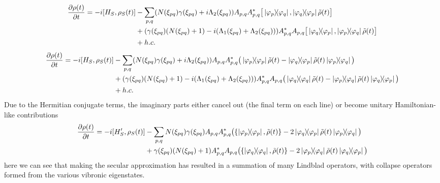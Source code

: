 \documentclass[]{article}
\begin{document}
\begin{itemize}
\begin{itemize}
\begin{align}
	\label{eq:VibronicSecular1}
	\begin{split}
		\pdv{\rho(t)}{t} = -i[H_S, \rho_S(t)] &- \sum_{p,q}  (N(\xi_{pq})\gamma(\xi_{pq})+i\Lambda_2(\xi_{pq})) A_{p,q}A_{p,q}^{*}\big[\dyad{\varphi_p}{\varphi_q}, \dyad{\varphi_q}{\varphi_p}\tilde{\rho}(t)\big] \\
		&+ (\gamma(\xi_{pq})(N(\xi_{pq})+1)-i(\Lambda_1(\xi_{pq})+\Lambda_2(\xi_{pq})))  A_{p,q}^{*}A_{p,q}\big[\dyad{\varphi_q}{\varphi_p}, \dyad{\varphi_p}{\varphi_q}\tilde{\rho}(t)\big]\\ &+ h.c. \\
	\end{split}
\end{align}
\begin{align}
	\label{eq:VibronicSecular2}
	\begin{split}
		\pdv{\rho(t)}{t} = -i[H_S, \rho_S(t)] &- \sum_{p,q}  (N(\xi_{pq})\gamma(\xi_{pq})+i\Lambda_2(\xi_{pq})) A_{p,q}A_{p,q}^{*}\big(\dyad{\varphi_p}{\varphi_p}\tilde{\rho}(t) - \dyad{\varphi_q}{\varphi_p}\tilde{\rho}(t)\dyad{\varphi_p}{\varphi_q}\big) \\
		&+ (\gamma(\xi_{pq})(N(\xi_{pq})+1)-i(\Lambda_1(\xi_{pq})+\Lambda_2(\xi_{pq})))  A_{p,q}^{*}A_{p,q}\big(\dyad{\varphi_q}{\varphi_q}\tilde{\rho}(t) - \dyad{\varphi_p}{\varphi_q}\tilde{\rho}(t)\dyad{\varphi_q}{\varphi_p}\big)\\ &+ h.c. \\
	\end{split}
\end{align}
Due to the Hermitian conjugate terms, the imaginary parts either cancel out (the final term on each line) or become unitary Hamiltonian-like contributions
\begin{align}
	\label{eq:VibronicSecular2}
	\begin{split}
		\pdv{\rho(t)}{t} = -i[H_S^{\prime}, \rho_S(t)] &- \sum_{p,q}  N(\xi_{pq})\gamma(\xi_{pq}) A_{p,q}A_{p,q}^{*}\big(\{\dyad{\varphi_p}{\varphi_p}, \tilde{\rho}(t)\} - 2\dyad{\varphi_q}{\varphi_p}\tilde{\rho}(t)\dyad{\varphi_p}{\varphi_q}\big) \\
		&+ \gamma(\xi_{pq})(N(\xi_{pq})+1)  A_{p,q}^{*}A_{p,q}\big(\{\dyad{\varphi_q}{\varphi_q}, \tilde{\rho}(t)\} - 2\dyad{\varphi_p}{\varphi_q}\tilde{\rho}(t)\dyad{\varphi_q}{\varphi_p}\big) \\
	\end{split}
\end{align}
here we can see that making the secular approximation has resulted in a summation of many Lindblad operators, with collapse operators formed from the various vibronic eigenstates.


\end{itemize}
\end{itemize}
\end{document}
